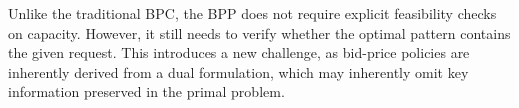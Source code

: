






Unlike the traditional BPC, the BPP does not require explicit feasibility checks on capacity. However, it still needs to verify whether the optimal pattern contains the given request. This introduces a new challenge, as bid-price policies are inherently derived from a dual formulation, which may inherently omit key information preserved in the primal problem.

